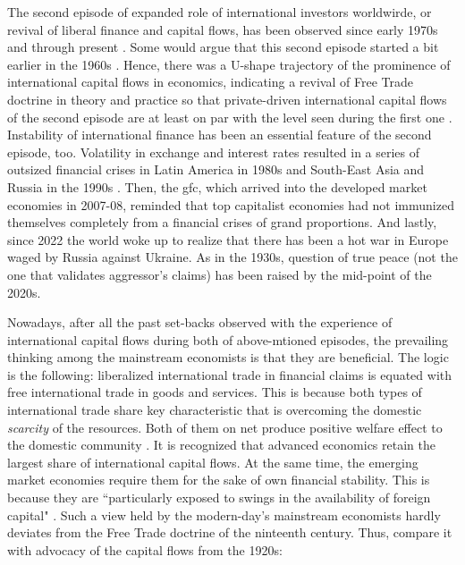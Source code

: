 The second episode of expanded role of international investors worldwirde, or revival of liberal finance and capital flows, has been observed since early 1970s and through present \citep{kregel2009}. Some would argue that this second episode started a bit earlier in the 1960s \citep{coombs1976,helleiner1994}. Hence, there was a U-shape trajectory of the prominence of international capital flows in economics, indicating a revival of Free Trade doctrine in theory and practice so that private-driven international capital flows of the second episode are at least on par  with the level seen during the first one \citep[see][p.~62]{milne2014}. Instability of international finance has been an essential feature of the second episode, too. Volatility in exchange and interest rates resulted in a series of outsized financial crises in Latin America in 1980s and South-East Asia and Russia in the 1990s \citep{kregel1996,kregel2009}. Then, the \ac{gfc}, which arrived into the developed market economies in 2007-08, reminded that top capitalist economies had not immunized themselves completely from a financial crises of grand proportions. And lastly, since 2022 the world woke up to realize that there has been a hot war in Europe waged by Russia against Ukraine. As in the 1930s, question of true peace (not the one that validates aggressor's claims) has been raised by the mid-point of the 2020s.

Nowadays, after all the past set-backs observed with the experience of international capital flows during both of above-mtioned episodes, the prevailing thinking among the mainstream economists is that they are beneficial. The logic is the following: liberalized international trade in financial claims is equated with free international trade in goods and services. This is because both types of international trade share key characteristic that is overcoming the domestic \textit{scarcity} of the resources. Both of them on net produce positive welfare effect to the domestic community \citep[p.~5]{milne2014}. It is recognized that advanced economics retain the largest share of international capital flows. At the same time, the emerging market economies require them for the sake of own financial stability. This is because they are ``particularly exposed to swings in the availability of foreign capital" \citep[p.~516]{koepke2019}. Such a view held by the modern-day's mainstream economists hardly deviates from the Free Trade doctrine of the ninteenth century. Thus, compare it with advocacy of the capital flows from the 1920s:

